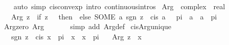 \begin{isabellebody}
%
\isadelimproof
\ \ %
\endisadelimproof
%
\isatagproof
{}\isamarkupfalse%
\ {\isacharparenleft}{\kern0pt}auto\ simp{\isacharcolon}{\kern0pt}\ cis{\isacharunderscore}{\kern0pt}conv{\isacharunderscore}{\kern0pt}exp\ intro{\isacharbang}{\kern0pt}{\isacharcolon}{\kern0pt}\ continuous{\isacharunderscore}{\kern0pt}intros{\isacharparenright}{\kern0pt}%
\endisatagproof
{\isafoldproof}%
%
\isadelimproof
%
\endisadelimproof
%
\isadelimdocument
%
\endisadelimdocument
%
\isatagdocument
%
\isamarkuptrue%
%
\endisatagdocument
{\isafolddocument}%
%
\isadelimdocument
%
\endisadelimdocument
{}\isamarkupfalse%
\ Arg\ {\isacharcolon}{\kern0pt}{\isacharcolon}{\kern0pt}\ {\isachardoublequoteopen}complex\ {\isasymRightarrow}\ real{\isachardoublequoteclose}\isanewline
\ \ \ {\isachardoublequoteopen}Arg\ z\ {\isacharequal}{\kern0pt}\ {\isacharparenleft}{\kern0pt}if\ z\ {\isacharequal}{\kern0pt}\ {}\ then\ {}\ else\ {\isacharparenleft}{\kern0pt}SOME\ a{\isachardot}{\kern0pt}\ sgn\ z\ {\isacharequal}{\kern0pt}\ cis\ a\ {\isasymand}\ {\isacharminus}{\kern0pt}\ pi\ {\isacharless}{\kern0pt}\ a\ {\isasymand}\ a\ {\isasymle}\ pi{\isacharparenright}{\kern0pt}{\isacharparenright}{\kern0pt}{\isachardoublequoteclose}\isanewline
\isanewline
{}\isamarkupfalse%
\ Arg{\isacharunderscore}{\kern0pt}zero{\isacharcolon}{\kern0pt}\ {\isachardoublequoteopen}Arg\ {}\ {\isacharequal}{\kern0pt}\ {}{\isachardoublequoteclose}\isanewline
%
\isadelimproof
\ \ %
\endisadelimproof
%
\isatagproof
{}\isamarkupfalse%
\ {\isacharparenleft}{\kern0pt}simp\ add{\isacharcolon}{\kern0pt}\ Arg{\isacharunderscore}{\kern0pt}def{\isacharparenright}{\kern0pt}%
\endisatagproof
{\isafoldproof}%
%
\isadelimproof
\isanewline
%
\endisadelimproof
\isanewline
{}\isamarkupfalse%
\ cis{\isacharunderscore}{\kern0pt}Arg{\isacharunderscore}{\kern0pt}unique{\isacharcolon}{\kern0pt}\isanewline
\ \ \ {\isachardoublequoteopen}sgn\ z\ {\isacharequal}{\kern0pt}\ cis\ x{\isachardoublequoteclose}\ \ {\isachardoublequoteopen}{\isacharminus}{\kern0pt}pi\ {\isacharless}{\kern0pt}\ x{\isachardoublequoteclose}\ \ {\isachardoublequoteopen}x\ {\isasymle}\ pi{\isachardoublequoteclose}\isanewline
\ \ \ {\isachardoublequoteopen}Arg\ z\ {\isacharequal}{\kern0pt}\ x{\isachardoublequoteclose}\isanewline
%
\isadelimproof
%
\endisadelimproof
%
\isatagproof
{}\isamarkupfalse%
\ {\isacharminus}{\kern0pt}\isanewline

\end{isabellebody}

